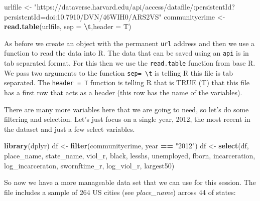 \documentclass[
]{book}
\newenvironment{Shaded}{\begin{snugshade}}{\end{snugshade}}
\newcommand{\AttributeTok}[1]{\textcolor[rgb]{0.13,0.29,0.53}{#1}}
\newcommand{\FunctionTok}[1]{\textcolor[rgb]{0.13,0.29,0.53}{\textbf{#1}}}
\newcommand{\NormalTok}[1]{#1}
\newcommand{\OtherTok}[1]{\textcolor[rgb]{0.56,0.35,0.01}{#1}}
\newcommand{\SpecialCharTok}[1]{\textcolor[rgb]{0.81,0.36,0.00}{\textbf{#1}}}
\newcommand{\StringTok}[1]{\textcolor[rgb]{0.31,0.60,0.02}{#1}}
\begin{document}
\begin{Shaded}
\begin{Highlighting}[]
\NormalTok{urlfile }\OtherTok{\textless{}{-}} \StringTok{"https://dataverse.harvard.edu/api/access/datafile/:persistentId?persistentId=doi:10.7910/DVN/46WIH0/ARS2VS"}
\NormalTok{communitycrime }\OtherTok{\textless{}{-}} \FunctionTok{read.table}\NormalTok{(urlfile, }\AttributeTok{sep =} \StringTok{\textquotesingle{}}\SpecialCharTok{\textbackslash{}t}\StringTok{\textquotesingle{}}\NormalTok{,}\AttributeTok{header =}\NormalTok{ T)}
\end{Highlighting}
\end{Shaded}

As before we create an object with the permanent \texttt{url} address and then we use a function to read the data into R. The data that can be saved using an \texttt{api} is in tab separated format. For this then we use the \texttt{read.table} function from base R. We pass two arguments to the function \texttt{sep=\ \textquotesingle{}\textbackslash{}t\textquotesingle{}} is telling R this file is tab separated. The \texttt{header\ =\ T} function is telling R that is TRUE (T) that this file has a first row that acts as a header (this row has the name of the variables).

There are many more variables here that we are going to need, so let's do some filtering and selection. Let's just focus on a single year, 2012, the most recent in the dataset and just a few select variables.

\begin{Shaded}
\begin{Highlighting}[]
\FunctionTok{library}\NormalTok{(dplyr)}
\NormalTok{df }\OtherTok{\textless{}{-}} \FunctionTok{filter}\NormalTok{(communitycrime, year }\SpecialCharTok{==} \StringTok{"2012"}\NormalTok{)}
\NormalTok{df }\OtherTok{\textless{}{-}} \FunctionTok{select}\NormalTok{(df, place\_name, state\_name, viol\_r, black, lesshs, unemployed, fborn, incarceration, log\_incarceraton, swornftime\_r, log\_viol\_r, largest50)}
\end{Highlighting}
\end{Shaded}

So now we have a more manageable data set that we can use for this session. The file includes a sample of 264 US cities (see \emph{place\_name}) across 44 of states:

\begin{Shaded}
\end{Shaded}
\end{document}
